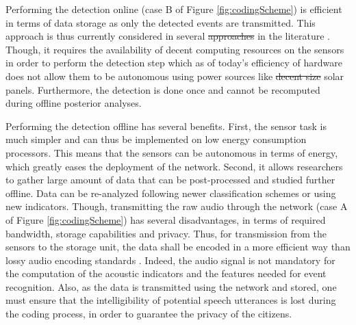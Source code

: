 \documentclass[sensors,article,submit,moreauthors,pdftex,10pt,a4paper]{mdpi}
\providecommand{\DIFaddtex}[1]{{\protect\color{blue}\uwave{#1}}} %
\providecommand{\DIFdeltex}[1]{{\protect\color{red}\sout{#1}}}                      %
\providecommand{\DIFaddbegin}{} %
\providecommand{\DIFaddend}{} %
\providecommand{\DIFdelbegin}{} %
\providecommand{\DIFdelend}{} %
\providecommand{\DIFadd}[1]{\texorpdfstring{\DIFaddtex{#1}}{#1}} %
\providecommand{\DIFdel}[1]{\texorpdfstring{\DIFdeltex{#1}}{}} %
\begin{document}
Performing the detection online (case B of Figure \ref{fig:codingScheme}) is efficient in terms of data storage as only the detected events are transmitted. This approach is thus currently considered in several \DIFdelbegin \DIFdel{approaches }\DIFdelend \DIFaddbegin \DIFadd{applications }\DIFaddend in the literature \cite{defreville2006automatic, mydlarz2017implementation, mydlarz2015design}. Though, it requires the availability of decent computing resources on the sensors in order to perform the detection step which as of today's efficiency of hardware does not allow them to be autonomous using power sources like \DIFdelbegin \DIFdel{decent size }\DIFdelend solar panels. Furthermore, the detection is done once and cannot be recomputed during offline posterior analyses.

Performing the detection offline has several benefits. First, the sensor task is much simpler and can thus be implemented on low energy consumption processors. This means that the sensors can be autonomous in terms of energy, which greatly eases the deployment of the network. Second, it allows researchers to gather large amount of data that can be post-processed and studied further offline. Data can be re-analyzed following newer classification schemes or using new indicators. Though, transmitting the raw audio  through the network (case A of Figure \ref{fig:codingScheme}) has several disadvantages, in terms of required bandwidth, storage capabilities and privacy. Thus, for transmission from the sensors to the storage unit, the data shall be encoded in a more efficient way than lossy audio encoding standards \cite{pan1995tutorial}. Indeed, the audio signal is not mandatory for the computation of the acoustic indicators and the features needed for event recognition. Also, as the data is transmitted using the network and stored, one must ensure that the intelligibility of potential speech utterances is lost during the coding process, in order to guarantee the privacy of the citizens.
\end{document}
